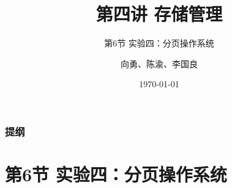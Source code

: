 


\title[第4讲]{第四讲 存储管理} %
\subtitle{第6节 实验四：分页操作系统}
\author{向勇、陈渝、李国良} %
\date{\today} %



\begin{frame}
\titlepage %
\end{frame}

\begin{frame}
\frametitle{提纲} %
\tableofcontents %
\end{frame}

\section{第6节 实验四：分页操作系统}%
